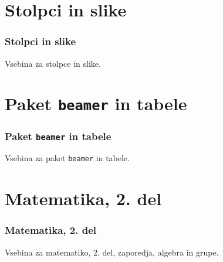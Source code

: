 \documentclass{beamer}
\begin{document}
\section{Stolpci in slike}
    \begin{frame}
      \frametitle{Stolpci in slike}
      Vsebina za stolpce in slike.
    \end{frame}
    

\section{Paket \texttt{beamer} in tabele}
    \begin{frame}
      \frametitle{Paket \texttt{beamer} in tabele}
      Vsebina za paket \texttt{beamer} in tabele.
    \end{frame}
    

\section[Matematika, 2. del\\\large{Zaporedja, algebra, grupe}]{Matematika, 2. del}
    \begin{frame}
      \frametitle{Matematika, 2. del}
      Vsebina za matematiko, 2. del, zaporedja, algebra in grupe.
    \end{frame}
\end{document}
